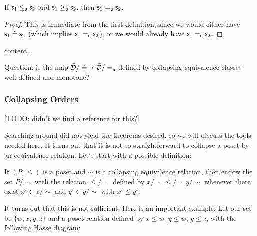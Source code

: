 \documentclass[10pt, onecolumn, nofootinbib]{revtex4-2}
\begin{document}
\begin{prop}
	If $\mathsf{s}_1\leq_{\mathsf{u}}\mathsf{s}_2$ and $\mathsf{s}_1\geq_{\mathsf{u}} \mathsf{s}_2$, then $\mathsf{s}_1=_{\mathsf{u}}\mathsf{s}_2$.
\end{prop}
\begin{proof}
	This is immediate from the first definition, since we would either have $\mathsf{s}_1\doteq\mathsf{s}_2$ (which implies $\mathsf{s}_1=_{\mathsf{u}}\mathsf{s}_2$), or we would already have $\mathsf{s}_1=_{\mathsf{u}}\mathsf{s}_2$.
\end{proof}

\begin{remark}
	content...
\end{remark}

Question: is the map $\bar{\mathcal{D}} / \doteq \to \bar{\mathcal{D}} / =_{\mathsf{u}}$ defined by collapsing equivalence classes well-defined and monotone? 


\subsubsection{Collapsing Orders}
[TODO: didn't we find a reference for this?]

Searching around did not yield the theorems desired, so we will discuss the tools needed here. It turns out that it is not so straightforward to collapse a poset by an equivalence relation. Let's start with a possible definition: 

If $(P,\leq)$ is a poset and $\sim$ is a collapsing equivalence relation, then endow the set $P/\sim$ with the relation $\leq/\sim$ defined by $x/\sim \leq/\sim y/\sim$ whenever there exist $x'\in x/\sim$ and $y'\in y/\sim$ with $x'\leq y'$. 

It turns out that this is not sufficient. Here is an important example. Let our set be $\{w,x,y,z\}$ and a poset relation defined by $x\leq w$, $y\leq w$, $y\leq z$, with the following Hasse diagram:

\end{document}
